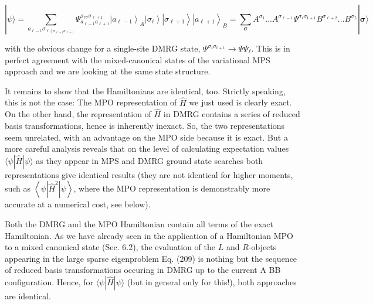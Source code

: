 \documentclass[12pt]{article}
\begin{document}
\begin{equation*}
|\psi\rangle=\sum_{a_{\ell-1} \sigma_{\ell\left(\sigma_{\ell+1} a_{\ell+1}\right.}} \Psi_{a_{\ell-1} a_{\ell+1}}^{\sigma_{\tau \sigma} \sigma_{\ell+1}}\left|a_{\ell-1}\right\rangle_{A}\left|\sigma_{\ell}\right\rangle\left|\sigma_{\ell+1}\right\rangle\left|a_{\ell+1}\right\rangle_{B}=\sum_{\boldsymbol{\sigma}} A^{\sigma_{1}} \ldots A^{\sigma_{\ell-1}} \Psi^{\sigma_{\ell} \sigma_{t+1}} B^{\sigma_{\ell+2}} \ldots B^{\sigma_{L}}|\boldsymbol{\sigma}\rangle \tag{219}
\end{equation*}


with the obvious change for a single-site DMRG state, $\Psi^{\sigma_{t} \sigma_{t+1}} \rightarrow \Psi \Psi_{\ell}$. This is in perfect agreement with the mixed-canonical states of the variational MPS approach and we are looking at the same state structure.

It remains to show that the Hamiltonians are identical, too. Strictly speaking, this is not the case: The MPO representation of $\hat{H}$ we just used is clearly exact. On the other hand, the representation of $\hat{H}$ in DMRG contains a series of reduced basis transformations, hence is inherently inexact. So, the two representations seem unrelated, with an advantage on the MPO side because it is exact. But a more careful analysis reveals that on the level of calculating expectation values $\langle\psi|\hat{H}| \psi\rangle$ as they appear in MPS and DMRG ground state searches both representations give identical results (they are not identical for higher moments, such as $\left\langle\psi\left|\hat{H}^{2}\right| \psi\right\rangle$, where the MPO representation is demonstrably more accurate at a numerical cost, see below).

Both the DMRG and the MPO Hamiltonian contain all terms of the exact Hamiltonian. As we have already seen in the application of a Hamiltonian MPO to a mixed canonical state (Sec. 6.2), the evaluation of the $L$ and $R$-objects appearing in the large sparse eigenproblem Eq. (209) is nothing but the sequence of reduced basis transformations occuring in DMRG up to the current A BB configuration. Hence, for $\langle\psi|\hat{H}| \psi\rangle$ (but in general only for this!), both approaches are identical.
\end{document}
